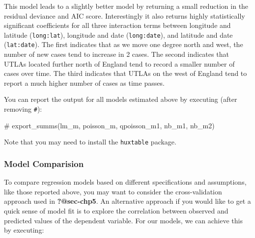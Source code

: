 \documentclass[
  letterpaper,
  krantz2]{style/krantz}
\newenvironment{Shaded}{\begin{snugshade}}{\end{snugshade}}
\newcommand{\CommentTok}[1]{\textcolor[rgb]{0.37,0.37,0.37}{#1}}
\begin{document}
This model leads to a slightly better model by returning a small
reduction in the residual deviance and AIC score. Interestingly it also
returns highly statistically significant coefficients for all three
interaction terms between longitude and latitude (\texttt{long:lat}),
longitude and date (\texttt{long:date}), and latitude and date
(\texttt{lat:date}). The first indicates that as we move one degree
north and west, the number of new cases tend to increase in 2 cases. The
second indicates that UTLAs located further north of England tend to
record a smaller number of cases over time. The third indicates that
UTLAs on the west of England tend to report a much higher number of
cases as time passes.

You can report the output for all models estimated above by executing
(after removing \texttt{\#}):

\begin{Shaded}
\begin{Highlighting}[]
\CommentTok{\# export\_summs(lm\_m, poisson\_m, qpoisson\_m1, nb\_m1, nb\_m2)}
\end{Highlighting}
\end{Shaded}

Note that you may need to install the \texttt{huxtable} package.

\hypertarget{model-comparision}{%
\subsubsection{Model Comparision}\label{model-comparision}}

To compare regression models based on different specifications and
assumptions, like those reported above, you may want to consider the
cross-validation approach used in \textbf{?@sec-chp5}. An alternative
approach if you would like to get a quick sense of model fit is to
explore the correlation between observed and predicted values of the
dependent variable. For our models, we can achieve this by executing:
\end{document}
